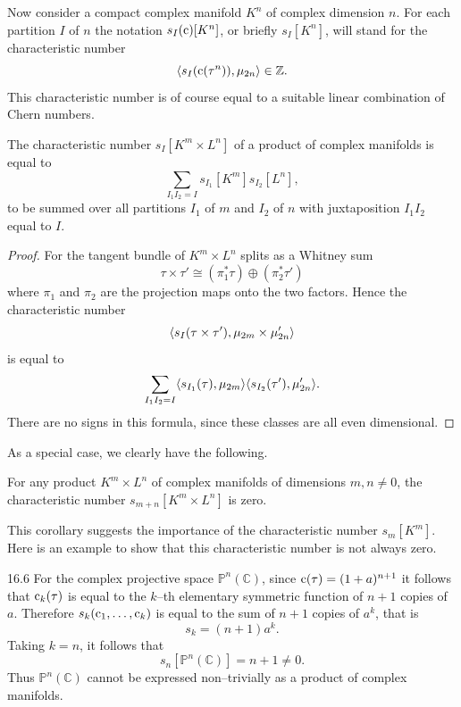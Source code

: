 \documentclass[../main]{subfiles}
\begin{document}
Now consider a compact complex manifold $K^n$ of complex dimension $n$. For each partition $I$ of $n$ the notation $s_I(\operatorname{c})[K^n]$, or briefly $s_I[K^n]$, will stand for the characteristic number \[\langle s_I(\operatorname{c}(\tau^n)),\mu_{2n}\rangle \in \mathbb Z.\] This characteristic number is of course equal to a suitable linear combination of Chern numbers.

\begin{corollary}\label{cor:16.4}
The characteristic number $s_I[K^m \times L^n]$ of a product of complex manifolds is equal to \[\sum_{I_1 I_2 = I} s_{I_1}[K^m] s_{I_2} [L^n],\] to be summed over all partitions $I_1$ of $m$ and $I_2$ of $n$ with juxtaposition $I_1 I_2$ equal to $I$. 
\end{corollary}

\begin{proof}
For the tangent bundle of $K^m \times L^n$ splits as a Whitney sum \[\tau \times \tau' \cong (\pi^\ast_1 \tau) \oplus (\pi^\ast_2 \tau')\] where $\pi_1$ and $\pi_2$ are the projection maps onto the two factors. Hence the characteristic number \[\langle s_I(\tau \times \tau'),\mu_{2m} \times \mu'_{2n}\rangle\] is equal to \[\sum_{I_1 I_2 = I} \langle s_{I_1}(\tau),\mu_{2m}\rangle \langle s_{I_2}(\tau'),\mu'_{2n}\rangle.\] There are no signs in this formula, since these classes are all even dimensional.
\end{proof}

As a special case, we clearly have the following.

\begin{corollary}
For any product $K^m \times L^n$ of complex manifolds of dimensions $m, n \ne 0$, the characteristic number $s_{m + n}[K^m \times L^n]$ is zero. 
\end{corollary}

This corollary suggests the importance of the characteristic number $s_m[K^m]$. Here is an example to show that this characteristic number is not always zero. 

\begin{customexample}{16.6}\label{ex:16.6}
For the complex projective space ${\mathbb P}^n(\mathbb C)$, since $\operatorname{c}(\tau) = (1 + a)^{n + 1}$ it follows that $\operatorname{c}_k(\tau)$ is equal to the $k$--th elementary symmetric function of $n + 1$ copies of $a$. Therefore $s_k(\operatorname{c}_1, \ldots, \operatorname{c}_k)$ is equal to the sum of $n + 1$ copies of $a^k$, that is \[s_k = (n + 1)a^k.\] Taking $k = n$, it follows that \[s_n[{\mathbb P}^n(\mathbb C)] = n + 1 \ne 0.\] Thus ${\mathbb P}^n(\mathbb C)$ cannot be expressed non--trivially as a product of complex manifolds. 
\end{customexample}\setcounter{theorem}{6}
\end{document}
